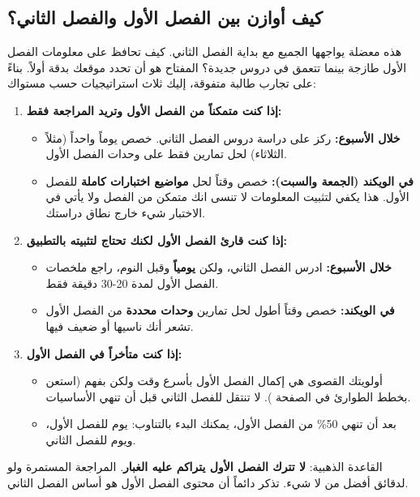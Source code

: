 \documentclass[12pt,a4paper]{book}
\begin{document}
	\subsection{كيف أوازن بين الفصل الأول والفصل الثاني؟}
	\label{sec:balance-semesters}
	
	هذه معضلة يواجهها الجميع مع بداية الفصل الثاني. كيف تحافظ على معلومات الفصل الأول طازجة بينما تتعمق في دروس جديدة؟ المفتاح هو أن تحدد موقعك بدقة أولاً. بناءً على تجارب طالبة متفوقة، إليك ثلاث استراتيجيات حسب مستواك:
	
	\begin{enumerate}
		\item \textbf{إذا كنت متمكناً من الفصل الأول وتريد المراجعة فقط:}
		\begin{itemize}
			\item \textbf{خلال الأسبوع:} ركز على دراسة دروس الفصل الثاني. خصص يوماً واحداً (مثلاً الثلاثاء) لحل تمارين فقط على وحدات الفصل الأول.
			\item \textbf{في الويكند (الجمعة والسبت):} خصص وقتاً لحل \textbf{مواضيع اختبارات كاملة} للفصل الأول. هذا يكفي لتثبيت المعلومات لا تنسى انك متمكن من الفصل ولا يأتي في الاختبار شيء خارج نطاق دراستك.
		\end{itemize}
		\item \textbf{إذا كنت قارئ الفصل الأول لكنك تحتاج لتثبيته بالتطبيق:}
		\begin{itemize}
			\item \textbf{خلال الأسبوع:} ادرس الفصل الثاني، ولكن \textbf{يومياً} وقبل النوم، راجع ملخصات الفصل الأول لمدة 20-30 دقيقة فقط.
			\item \textbf{في الويكند:} خصص وقتاً أطول لحل تمارين \textbf{وحدات محددة} من الفصل الأول تشعر أنك ناسيها أو ضعيف فيها.
		\end{itemize}
		\item \textbf{إذا كنت متأخراً في الفصل الأول:}
		\begin{itemize}
			\item أولويتك القصوى هي إكمال الفصل الأول بأسرع وقت ولكن بفهم (استعن بخطط الطوارئ في الصفحة \pageref{sec:psy-late-start-success}). لا تنتقل للفصل الثاني قبل أن تنهي الأساسيات. 
			\item بعد أن تنهي 50\% من الفصل الأول، يمكنك البدء بالتناوب: يوم للفصل الأول، ويوم للفصل الثاني.
		\end{itemize}
	\end{enumerate}
	
	القاعدة الذهبية: \textbf{لا تترك الفصل الأول يتراكم عليه الغبار}. المراجعة المستمرة ولو لدقائق أفضل من لا شيء. تذكر دائماً أن محتوى الفصل الأول هو أساس الفصل الثاني.
	
\end{document}
